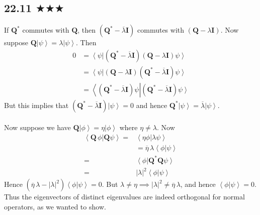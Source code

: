\subsection{22.11 $\bigstar \bigstar\bigstar$}
If $\mathbf{Q}^*$ commutes with $\mathbf{Q}$, then $(\mathbf{Q}^*-\overline{\lambda}\mathbf{I})$ commutes with $(\mathbf{Q}-\lambda \mathbf{I})$. Now suppose $\mathbf{Q}\left|\psi\right>=\lambda\left|\psi\right>$. Then 
\begin{align*}
0&=\left< \psi\right|(\mathbf{Q}^*-\overline{\lambda}\mathbf{I})(\mathbf{Q}-\lambda \mathbf{I})\left.\psi\right >\\
&=\left< \psi\right|(\mathbf{Q}-\lambda \mathbf{I})(\mathbf{Q}^*-\overline{\lambda}\mathbf{I})\left.\psi\right >\\
&=\left<(\mathbf{Q}^*-\overline{\lambda}\mathbf{I}) \psi\right|(\mathbf{Q}^*-\overline{\lambda}\mathbf{I})\left.\psi\right >
\end{align*}
But this implies that $(\mathbf{Q}^*-\overline{\lambda}\mathbf{I})\left|\psi\right >=0$ and hence $\mathbf{Q}^*\left|\psi\right >=\overline{\lambda}\left|\psi\right >$. \\ \\ Now suppose we have $\mathbf{Q}\left|\phi\right >=\eta\left|\phi\right >$ where $\eta\neq\lambda$. Now
\begin{align*}
\left<\mathbf{Q}\, \phi\right|\mathbf{Q} \left.\psi\right >=&\left<\eta\phi\right|\lambda\left.\psi\right >\\
&=\overline{\eta}\,\lambda\left<\phi\right|\left.\psi\right >\\
=&\left< \phi\right|\mathbf{Q}^*\mathbf{Q} \left.\psi\right >\\
=&|\lambda|^2\left< \phi\right|\left.\psi\right >
\end{align*}
Hence $(\overline{\eta}\,\lambda-|\lambda|^2)\left<\phi\right|\left.\psi\right >=0$. But $\lambda\neq\eta\implies |\lambda|^2\neq \overline{\eta}\,\lambda$, and hence  $\left<\phi\right|\left.\psi\right >=0$. Thus the eigenvectors of distinct eigenvalues are indeed orthogonal for normal operators, as we wanted to show.


